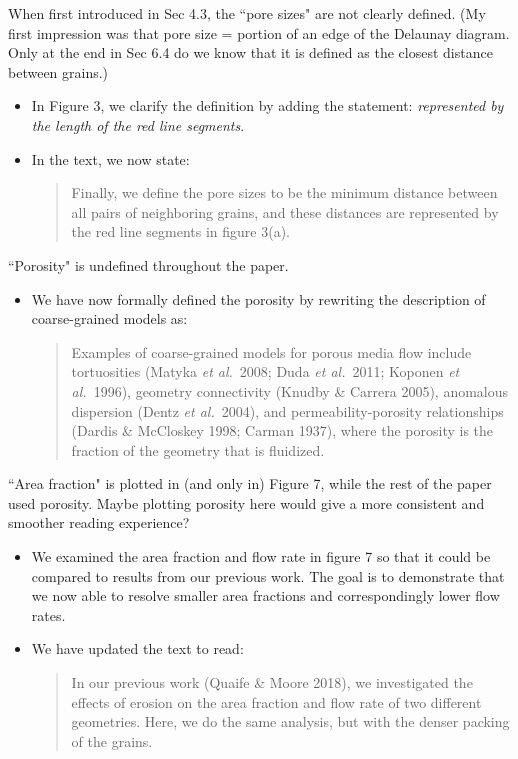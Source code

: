 \documentclass[11pt]{article}
\newcommand{\comment}[1]{{\color{blue} #1}}
\begin{document}
\noindent
\comment{When first introduced in Sec 4.3, the ``pore sizes" are not
clearly defined. (My first impression was that pore size = portion of an
edge of the Delaunay diagram. Only at the end in Sec 6.4 do we know that
it is defined as the closest distance between grains.)}
\begin{itemize}
  \item In Figure 3, we clarify the definition by adding the statement:
    {\em represented by the length of the red line segments}.
  \item In the text, we now state:
    \begin{quotation}
    \noindent
      Finally, we define the pore sizes to be the minimum distance
      between all pairs of neighboring grains, and these distances are
      represented by the red line segments in figure 3(a).
    \end{quotation}
\end{itemize}

\noindent
\comment{``Porosity" is undefined throughout the paper.}
\begin{itemize}
  \item We have now formally defined the porosity by rewriting the
    description of coarse-grained models as:
  \begin{quotation}
  \noindent
    Examples of coarse-grained models for porous media flow include
    tortuosities (Matyka {\em et al.}~2008; Duda {\em et al.}~2011;
    Koponen {\em et al.}~1996), geometry connectivity (Knudby \& Carrera
    2005), anomalous dispersion (Dentz {\em et al.}~2004), and
    permeability-porosity relationships (Dardis \& McCloskey 1998;
    Carman 1937), where the porosity is the fraction of the geometry
    that is fluidized.
  \end{quotation}


\end{itemize}

\noindent
\comment{``Area fraction" is plotted in (and only in) Figure 7, while
the rest of the paper used porosity. Maybe plotting porosity here would
give a more consistent and smoother reading experience?}
\begin{itemize}
  \item We examined the area fraction and flow rate in figure 7 so that
    it could be compared to results from our previous work. The goal is
    to demonstrate that we now able to resolve smaller area fractions
    and correspondingly lower flow rates.

  \item We have updated the text to read:
    \begin{quotation}
      \noindent
      In our previous work (Quaife \& Moore 2018), we investigated the
      effects of erosion on the area fraction and flow rate of two
      different geometries. Here, we do the same analysis, but with the
      denser packing of the grains.
    \end{quotation}

\end{itemize}
\end{document}
